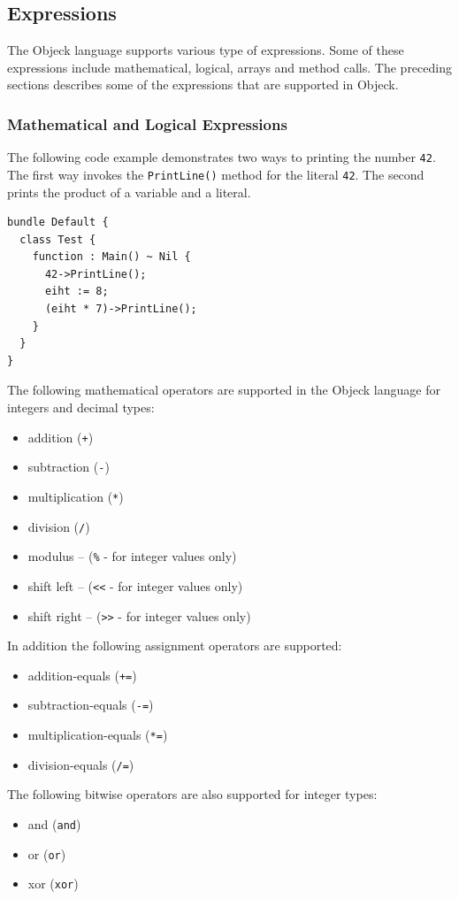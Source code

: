 \documentclass[11pt]{article}
\begin{document}
\subsection{Expressions}
The Objeck language supports various type of expressions.  Some of
these expressions include mathematical, logical, arrays and method
calls.  The preceding sections describes some of the expressions
that are supported in Objeck.

\subsubsection{Mathematical and Logical Expressions}
The following code example demonstrates two ways to printing the
number \texttt{42}.  The first way invokes the \texttt{PrintLine()}
method for the literal \texttt{42}.  The second prints the product of
a variable and a literal.

\begin{verbatim}
bundle Default {
  class Test {
    function : Main() ~ Nil {
      42->PrintLine();
      eiht := 8;
      (eiht * 7)->PrintLine();
    }
  }
}
\end{verbatim}

The following mathematical operators are supported in the Objeck
language for integers and decimal types:
\begin{itemize}
\item addition (\texttt{+})
\item subtraction (\texttt{-})
\item multiplication (\texttt{*})
\item division (\texttt{/})
\item modulus -- (\texttt{\%} - for integer values only)
\item shift left -- (\texttt{<<} - for integer values only)
\item shift right -- (\texttt{>>} - for integer values only)
\end{itemize}

In addition the following assignment operators are supported:
\begin{itemize}
\item addition-equals (\texttt{+=})
\item subtraction-equals (\texttt{-=})
\item multiplication-equals (\texttt{*=})
\item division-equals (\texttt{/=})
\end{itemize}

The following bitwise operators are also supported for integer types:
\begin{itemize}
\item and (\texttt{and})
\item or (\texttt{or})
\item xor (\texttt{xor})
\end{itemize}
\end{document}

